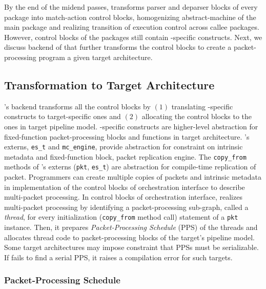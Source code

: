 \documentclass[letterpaper,twocolumn,10pt]{article}
\begin{document}
By the end of the midend passes, \ucomp transforms parser and deparser blocks of every package into match-action control blocks, homogenizing abstract-machine of the main package and realizing transition of execution control across callee packages.
However, control blocks of the packages still contain \uarch-specific constructs.
Next, we discuss backend of \ucomp that further transforms the control blocks to create a packet-processing program a given target architecture.


\subsection{Transformation to Target Architecture}
\ucomp's backend transforms all the control blocks by $(1)$ translating \uarch-specific constructs to target-specific ones and $(2)$ allocating the control blocks to the ones in target pipeline model.
\uarch-specific constructs are higher-level abstraction for fixed-function packet-processing blocks and functions in target architecture.
\uarch's externs, \texttt{es\_t} and \texttt{mc\_engine}, provide abstraction for constraint on intrinsic metadata and fixed-function block, packet replication engine.
The \texttt{copy\_from} methods of \uarch's externs (\texttt{pkt}, \texttt{es\_t}) are abstraction for compile-time replication of packet.
Programmers can create multiple copies of packets and intrinsic metadata in implementation of the control blocks of orchestration interface to describe multi-packet processing.
In control blocks of orchestration interface, \ucomp realizes multi-packet processing by identifying a packet-processing sub-graph, called a \emph{thread}, for every initialization (\texttt{copy\_from} method call) statement of a \texttt{pkt} instance.
Then, it prepares \emph{Packet-Processing Schedule} (PPS) of the threads and allocates thread code to packet-processing blocks of the target's pipeline model.
Some target architectures may impose constraint that PPSs must be serializable.
If \ucomp fails to find a serial PPS, it raises a compilation error for such targets. 



\subsubsection{Packet-Processing Schedule}
\label{subsubsection:packet-processing-schedule}
\end{document}
